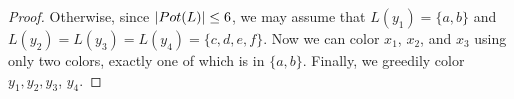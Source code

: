 \begin{proof}
Otherwise, since $\left|Pot(L)\right|\le 6$, we may assume that
$L(y_1)=\{a,b\}$ and $L(y_2)=L(y_3)=L(y_4)=\{c,d,e,f\}$.  Now we can color
$x_1$, $x_2$, and $x_3$ using only two colors, exactly one of which is in
$\{a,b\}$.  Finally, we greedily color $y_1, y_2, y_3$, $y_4$.
%
%
%
%
%
%
\end{proof}

